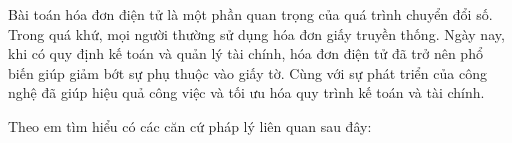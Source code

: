  
Bài toán hóa đơn điện tử là một phần quan trọng của quá trình chuyển đổi số. Trong quá khứ, mọi người thường sử dụng hóa đơn giấy truyền thống. Ngày nay, khi có quy định kế toán và quản lý tài chính, hóa đơn điện tử đã trở nên phổ biến giúp giảm bớt sự phụ thuộc vào giấy tờ. Cùng với sự phát triển của công nghệ đã giúp hiệu quả công việc và tối ưu hóa quy trình kế toán và tài chính.

Theo em tìm hiểu có các căn cứ pháp lý liên quan sau đây: